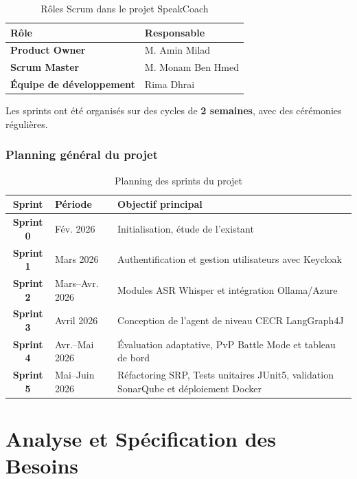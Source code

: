 \documentclass[12pt,a4paper]{report}
\begin{document}
\begin{table}[H]
\centering
\caption{Rôles Scrum dans le projet SpeakCoach}
\label{tab:scrum-roles}
\begin{tabular}{>{\bfseries}p{4cm} p{8cm}}
\toprule
\textbf{Rôle} & \textbf{Responsable} \\
\midrule
Product Owner & M. Amin Milad \\
Scrum Master & M. Monam Ben Hmed \\
Équipe de développement & Rima Dhrai \\
\bottomrule
\end{tabular}
\end{table}

Les sprints ont été organisés sur des cycles de \textbf{2 semaines}, avec des cérémonies régulières.

\subsection{Planning général du projet}

\begin{table}[H]
\centering
\caption{Planning des sprints du projet}
\label{tab:planning}
\begin{tabular}{>{\bfseries}c p{4cm} p{6cm}}
\toprule
\textbf{Sprint} & \textbf{Période} & \textbf{Objectif principal} \\
\midrule
Sprint 0 & Fév. 2026 & Initialisation, étude de l'existant \\
Sprint 1 & Mars 2026 & Authentification et gestion utilisateurs avec Keycloak \\
Sprint 2 & Mars--Avr. 2026 & Modules ASR Whisper et intégration Ollama/Azure \\
Sprint 3 & Avril 2026 & Conception de l'agent de niveau CECR LangGraph4J \\
Sprint 4 & Avr.--Mai 2026 & Évaluation adaptative, PvP Battle Mode et tableau de bord \\
Sprint 5 & Mai--Juin 2026 & Réfactoring SRP, Tests unitaires JUnit5, validation SonarQube et déploiement Docker \\
\bottomrule
\end{tabular}
\end{table}

\chapter{Analyse et Spécification des Besoins}
\end{document}
